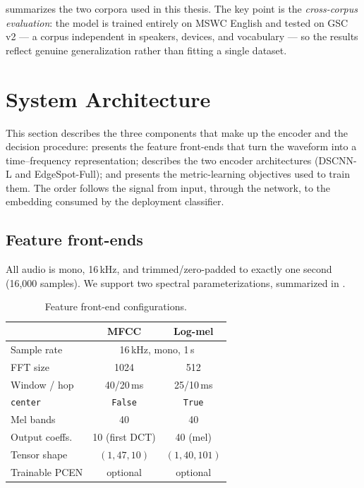 \documentclass[12pt,a4paper]{report}
\newcommand{\code}[1]{\texttt{\small #1}}
\begin{document}
 summarizes the two corpora used in this thesis. The key point
is the \emph{cross-corpus evaluation}: the model is trained entirely on MSWC
English and tested on GSC v2 --- a corpus independent in speakers, devices, and
vocabulary --- so the results reflect genuine generalization rather than fitting a
single dataset.

\section{System Architecture}\label{sec:arch}

This section describes the three components that make up the encoder and the
decision procedure:  presents the feature front-ends that turn
the waveform into a time--frequency representation;  describes
the two encoder architectures (DSCNN-L and EdgeSpot-Full); and 
presents the metric-learning objectives used to train them. The order follows the
signal from input, through the network, to the embedding consumed by the
deployment classifier.

\subsection{Feature front-ends}\label{sec:frontends}

All audio is mono, 16\,kHz, and trimmed/zero-padded to exactly one second
(16,000 samples). We support two spectral parameterizations, summarized in
.

\begin{table}[H]
\centering
\caption{Feature front-end configurations.}
\label{tab:features}
\begin{tabular}{lcc}
\toprule
 & \textbf{MFCC} & \textbf{Log-mel} \\
\midrule
Sample rate     & \multicolumn{2}{c}{16\,kHz, mono, 1\,s} \\
FFT size        & 1024  & 512  \\
Window / hop    & 40/20\,ms & 25/10\,ms \\
\code{center}   & \code{False} & \code{True} \\
Mel bands       & 40 & 40 \\
Output coeffs.  & 10 (first DCT) & 40 (mel) \\
Tensor shape    & $(1,47,10)$ & $(1,40,101)$ \\
Trainable PCEN  & optional & optional \\
\bottomrule
\end{tabular}
\end{table}
\end{document}

